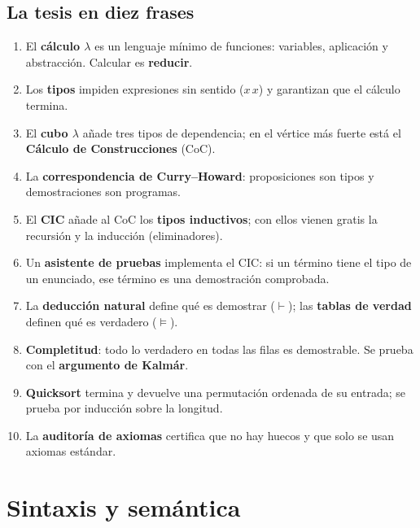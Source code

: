 \documentclass[11pt,a4paper]{article}
\newcommand{\termino}[1]{\textbf{#1}}
\begin{document}
\subsection*{La tesis en diez frases}
\begin{enumerate}
  \item El \termino{cálculo \(\lambda\)} es un lenguaje mínimo de funciones:
    variables, aplicación y abstracción. Calcular es \termino{reducir}.
  \item Los \termino{tipos} impiden expresiones sin sentido (\(x\,x\)) y
    garantizan que el cálculo termina.
  \item El \termino{cubo \(\lambda\)} añade tres tipos de dependencia; en el
    vértice más fuerte está el \termino{Cálculo de Construcciones} (CoC).
  \item La \termino{correspondencia de Curry--Howard}: proposiciones son tipos
    y demostraciones son programas.
  \item El \termino{CIC} añade al CoC los \termino{tipos inductivos}; con ellos
    vienen gratis la recursión y la inducción (eliminadores).
  \item Un \termino{asistente de pruebas} implementa el CIC: si un término
    tiene el tipo de un enunciado, ese término es una demostración comprobada.
  \item La \termino{deducción natural} define qué es demostrar (\(\vdash\)); las
    \termino{tablas de verdad} definen qué es verdadero (\(\models\)).
  \item \termino{Completitud}: todo lo verdadero en todas las filas es
    demostrable. Se prueba con el \termino{argumento de Kalmár}.
  \item \termino{Quicksort} termina y devuelve una permutación ordenada de su
    entrada; se prueba por inducción sobre la longitud.
  \item La \termino{auditoría de axiomas} certifica que no hay huecos y que solo
    se usan axiomas estándar.
\end{enumerate}

\section{Sintaxis y semántica}
\end{document}
